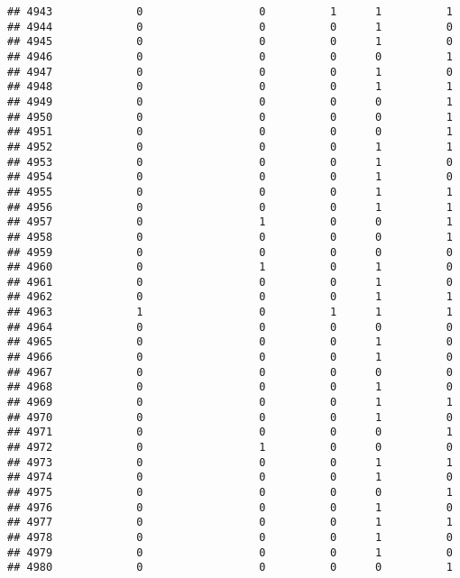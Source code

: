 \documentclass[
]{article}
\begin{document}
\begin{verbatim}
## 4943             0                  0          1      1          1
## 4944             0                  0          0      1          0
## 4945             0                  0          0      1          0
## 4946             0                  0          0      0          1
## 4947             0                  0          0      1          0
## 4948             0                  0          0      1          1
## 4949             0                  0          0      0          1
## 4950             0                  0          0      0          1
## 4951             0                  0          0      0          1
## 4952             0                  0          0      1          1
## 4953             0                  0          0      1          0
## 4954             0                  0          0      1          0
## 4955             0                  0          0      1          1
## 4956             0                  0          0      1          1
## 4957             0                  1          0      0          1
## 4958             0                  0          0      0          1
## 4959             0                  0          0      0          0
## 4960             0                  1          0      1          0
## 4961             0                  0          0      1          0
## 4962             0                  0          0      1          1
## 4963             1                  0          1      1          1
## 4964             0                  0          0      0          0
## 4965             0                  0          0      1          0
## 4966             0                  0          0      1          0
## 4967             0                  0          0      0          0
## 4968             0                  0          0      1          0
## 4969             0                  0          0      1          1
## 4970             0                  0          0      1          0
## 4971             0                  0          0      0          1
## 4972             0                  1          0      0          0
## 4973             0                  0          0      1          1
## 4974             0                  0          0      1          0
## 4975             0                  0          0      0          1
## 4976             0                  0          0      1          0
## 4977             0                  0          0      1          1
## 4978             0                  0          0      1          0
## 4979             0                  0          0      1          0
## 4980             0                  0          0      0          1

\end{verbatim}
\end{document}
